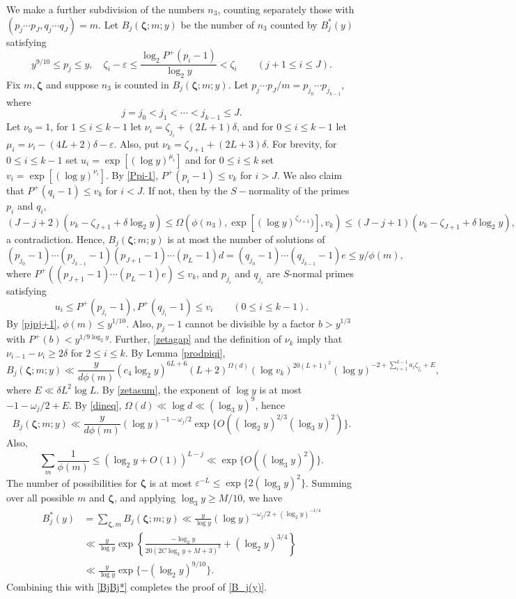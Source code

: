 \documentclass[11pt]{amsart}
\theoremstyle{remark}
\theoremstyle{plain}
\numberwithin{equation}{section}
\newcommand{\be}{\begin{equation}}
\newcommand{\ee}{\end{equation}}
\newcommand{\del}{\ensuremath{\delta}}
\newcommand{\e}{\ensuremath{\varepsilon}}
\renewcommand{\(}{\left(}
\renewcommand{\)}{\right)}
\renewcommand{\le}{\leqslant}
\renewcommand{\ge}{\geqslant}
\renewcommand{\d}{\delta}
\newcommand{\om}{\Omega}
\newcommand{\bz}{\boldsymbol\zeta}
\begin{document}
We make a further subdivision of the numbers $n_3$, counting
separately those
with $(p_j \cdots p_{J}, q_j \cdots q_{J})=m$.  Let
$B_j(\bz;m;y)$ be the number of $n_3$ counted by $B_j^*(y)$ satisfying
$$
y^{9/10}\le p_j\le y,\quad
\zeta_i-\e \le \frac{\log_2 P^+(p_i-1)}{\log_2 y} < \zeta_i \qquad
(j+1\le i\le J).
$$
Fix $m,\bz$ and  suppose $n_3$ is counted in $B_j(\bz;m;y)$.
Let $p_j\cdots p_J/m = p_{j_0} \cdots p_{j_{k-1}}$, where
$$
j=j_0<j_1< \cdots <j_{k-1} \le J.
$$
Let $\nu_0=1$, for $1\le i\le k-1$ let $\nu_i=\zeta_{j_i}+(2L+1)\d$, and for 
$0\le i\le k-1$ let $\mu_i=\nu_i-(4L+2)\d - \e$.   Also, put 
$\nu_k = \zeta_{J+1} + (2L+3)\delta.$
For brevity, for $0\le i\le k-1$ set $u_i=\exp [ (\log y)^{\mu_i}]$ and 
for $0\le i\le k$ set $v_i=\exp [ (\log y)^{\nu_i} ]$.
By \eqref{Ppi-1}, $P^+(p_i-1)\le v_k$ for $i>J$.  We also claim that
$P^+(q_i-1)\le v_k$ for $i<J$.  If not, then by the $S-$normality of the primes
$p_i$ and $q_i$,
$$
(J-j+2)(\nu_k-\zeta_{J+1}+\delta\log_2 y) \le \Omega(\phi(n_3),
\exp [ (\log y)^{\zeta_{J+1}}) ],v_k) \le (J-j+1)(\nu_k-\zeta_{J+1}+\delta\log_2 y),
$$
a contradiction.
Hence, $B_j(\bz;m;y)$ is at most the number of
solutions of
\be\label{main m}
(p_{j_0}-1) \cdots (p_{j_{k-1}}-1)(p_{J+1}-1)\cdots(p_L-1)d = (q_{j_0}-1) \cdots
(q_{j_{k-1}}-1)e \le y/\phi(m),
\ee
where $P^+((p_{J+1}-1)\cdots(p_L-1)e)\le v_k$,
 and $p_{j_i}$ and $q_{j_i}$
are $S$-normal primes satisfying
\be\label{piqi ranges}
u_i \le P^+(p_{j_i}-1), P^+(q_{j_i}-1) \le v_i \qquad
(0\le i\le k-1).
\ee
By \eqref{pjpj+1}, $\phi(m)\le y^{1/10}$.  Also, $p_j-1$ cannot be divisible by
a factor $b>y^{1/3}$ with $P^+(b)<y^{1/9\log_2 y}$.
Further, \eqref{zetagap} and the definition of $\nu_k$ imply that $\nu_{i-1}-\nu_i \ge 2\delta$ for $2\le i\le k$.
By Lemma \ref{prodpiqi},
\[
B_j(\bz;m;y) \ll \frac{y}{d\phi(m)} (c_4 \log_2 y)^{6L+6} (L+2)^{\om(d)}
(\log v_k)^{20(L+1)^2}(\log y)^{-2+\sum_{i=1}^{k-1}a_i \zeta_{j_i}+E},
\]
where $E\ll \del L^2 \log L$.  By \eqref{zetasum}, the exponent of $\log y$ 
is at most $-1-\omega_j/2+E$.  By \eqref{dineq}, 
$\Omega(d)\ll \log d \ll (\log_3 y)^9$, hence
\[
 B_j(\bz;m;y) \ll \frac{y}{d\phi(m)}  (\log y)^{-1-\omega_j/2}
\exp \{ O( (\log_2 y)^{2/3}(\log_3 y)^2) \}.
\]
Also,
$$
\sum_{m} \frac1{\phi(m)} \le (\log_2 y + O(1))^{L-j} \ll
\exp\{O((\log_3 y)^2 )\}.
$$
The number of possibilities for $\bz$ is at most
$\e^{-L} \le \exp\{ 2(\log_3 y)^2 \}$.  Summing over all
possible $m$ and $\bz$, and applying $\log_3 y\ge M/10$, we have
\begin{align*}
B_j^*(y) &= \sum_{\bz,m} B_j(\bz;m;y)
\ll \frac{y}{\log y} (\log y)^{-\omega_j/2+ (\log_2
y)^{-1/4}}
\\ &\ll \frac{y}{\log y} \exp \left\{ \frac{-\log_2 y}{20(2C\log_3 y+M+3)^3}
 + (\log_2 y)^{3/4} \right\} \\
&\ll \frac{y}{\log y} \exp \{ - (\log_2 y)^{9/10}  \}.
\end{align*}
Combining this with \eqref{BjBj*} completes the proof of
\eqref{B_j(y)}.
\end{document}
